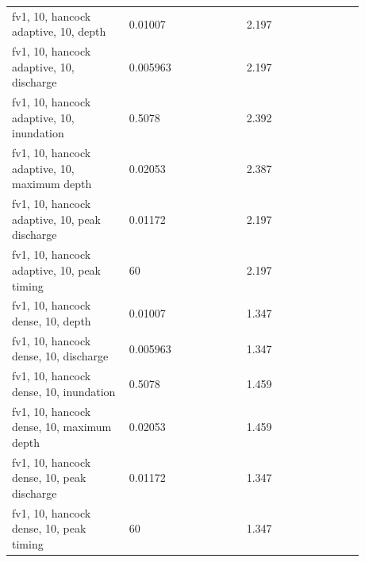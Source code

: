 \begin{longtable}{p{0.2933\linewidth}p{0.2933\linewidth}p{0.2933\linewidth}}
fv1, 10, hancock adaptive, 10, depth & 0.01007 & 2.197 \\
fv1, 10, hancock adaptive, 10, discharge & 0.005963 & 2.197 \\
fv1, 10, hancock adaptive, 10, inundation & 0.5078 & 2.392 \\
fv1, 10, hancock adaptive, 10, maximum depth & 0.02053 & 2.387 \\
fv1, 10, hancock adaptive, 10, peak discharge & 0.01172 & 2.197 \\
fv1, 10, hancock adaptive, 10, peak timing & 60 & 2.197 \\
fv1, 10, hancock dense, 10, depth & 0.01007 & 1.347 \\
fv1, 10, hancock dense, 10, discharge & 0.005963 & 1.347 \\
fv1, 10, hancock dense, 10, inundation & 0.5078 & 1.459 \\
fv1, 10, hancock dense, 10, maximum depth & 0.02053 & 1.459 \\
fv1, 10, hancock dense, 10, peak discharge & 0.01172 & 1.347 \\
fv1, 10, hancock dense, 10, peak timing & 60 & 1.347 \\
\end{longtable}
\endgroup
